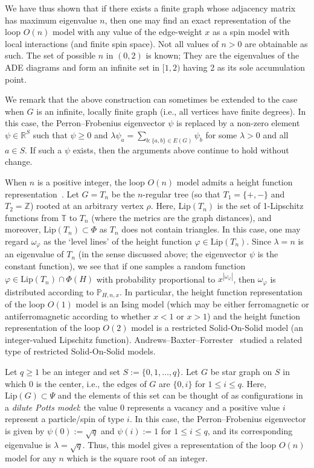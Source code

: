 \documentclass[12pt,reqno]{article}
\def\R{\mathbb{R}}
\def\Z{\mathbb{Z}}
\def\T{\mathbb{T}}
\renewcommand{\Pr}{\mathbb{P}}
\begin{document}
We have thus shown that if there exists a finite graph whose adjacency matrix has maximum eigenvalue $n$, then one may find an exact representation of the loop $O(n)$ model with any value of the edge-weight $x$ as a spin model with local interactions (and finite spin space). Not all values of $n>0$ are obtainable as such.
The set of possible $n$ in $(0,2)$ is known; They are the eigenvalues of the ADE diagrams and form an infinite set in $[1,2)$ having 2 as its sole accumulation point.


We remark that the above construction can sometimes be extended to the case when $G$ is an infinite, locally finite graph (i.e., all vertices have finite degrees). In this case, the Perron--Frobenius eigenvector $\psi$ is replaced by a non-zero element $\psi \in \R^S$ such that $\psi \ge 0$ and $\lambda \psi_a = \sum_{b:\{a,b\} \in E(G)} \psi_b$ for some $\lambda>0$ and all $a\in S$. If such a $\psi$ exists, then the arguments above continue to hold without change.


\medbreak
{}
\label{sec:loop-o-n-height}
When $n$ is a positive integer, the loop $O(n)$ model admits a height function representation~\cite{DomMukNie81}. Let $G=T_n$ be the $n$-regular tree (so that $T_1 = \{+,-\}$ and $T_2=\Z$) rooted at an arbitrary vertex $\rho$. Here, $\text{Lip}(T_n)$ is the set of 1-Lipschitz functions from $\T$ to $T_n$ (where the metrics are the graph distances), and moreover, $\text{Lip}(T_n) \subset \Phi$ as $T_n$ does not contain triangles. In this case, one may regard $\omega_\varphi$ as the `level lines' of the height function $\varphi \in \text{Lip}(T_n)$.
Since $\lambda=n$ is an eigenvalue of $T_n$ (in the sense discussed above; the eigenvector $\psi$ is the constant function), we see that if one samples a random function $\varphi\in \text{Lip}(T_n) \cap \Phi(H)$ with probability proportional to $x^{|\omega_\varphi|}$, then $\omega_\varphi$ is distributed according to $\Pr_{H,n,x}$. In particular, the height function representation of the loop $O(1)$ model is an Ising model (which may be either ferromagnetic or antiferromagnetic according to whether $x<1$ or $x>1$) and the height function representation of the loop $O(2)$ model is a restricted Solid-On-Solid model (an integer-valued Lipschitz function). Andrews--Baxter--Forrester~\cite{andrews1984eight} studied a related type of restricted Solid-On-Solid models.

\medbreak
{}
Let $q \ge 1$ be an integer and set $S := \{0,1,\dots,q\}$.
Let $G$ be star graph on $S$ in which $0$ is the center, i.e., the edges of $G$ are $\{0,i\}$ for $1 \le i \le q$. Here, $\text{Lip}(G) \subset \Psi$ and the elements of this set can be thought of as configurations in a \emph{dilute Potts model}: the value $0$ represents a vacancy and a positive value $i$ represent a particle/spin of type $i$. In this case, the Perron--Frobenius eigenvector is given by $\psi(0) := \sqrt{q}$ and $\psi(i) := 1$ for $1 \le i \le q$, and its corresponding eigenvalue is $\lambda = \sqrt{q}$. Thus, this model gives a representation of the loop $O(n)$ model for any $n$ which is the square root of an integer.
\end{document}
